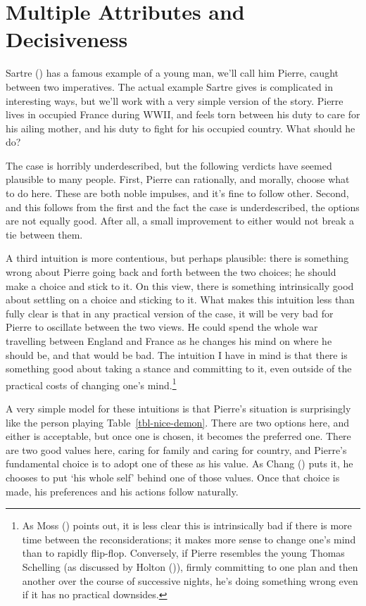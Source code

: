 \documentclass[
  11pt,
  letterpaper,
  DIV=11,
  numbers=noendperiod,
  twoside]{scrartcl}
\begin{document}
\section{Multiple Attributes and Decisiveness}\label{sec-sartre}

Sartre () has a famous example of a
young man, we'll call him Pierre, caught between two imperatives. The
actual example Sartre gives is complicated in interesting ways, but
we'll work with a very simple version of the story. Pierre lives in
occupied France during WWII, and feels torn between his duty to care for
his ailing mother, and his duty to fight for his occupied country. What
should he do?

The case is horribly underdescribed, but the following verdicts have
seemed plausible to many people. First, Pierre can rationally, and
morally, choose what to do here. These are both noble impulses, and it's
fine to follow other. Second, and this follows from the first and the
fact the case is underdescribed, the options are not equally good. After
all, a small improvement to either would not break a tie between them.

A third intuition is more contentious, but perhaps plausible: there is
something wrong about Pierre going back and forth between the two
choices; he should make a choice and stick to it. On this view, there is
something intrinsically good about settling on a choice and sticking to
it. What makes this intuition less than fully clear is that in any
practical version of the case, it will be very bad for Pierre to
oscillate between the two views. He could spend the whole war travelling
between England and France as he changes his mind on where he should be,
and that would be bad. The intuition I have in mind is that there is
something good about taking a stance and committing to it, even outside
of the practical costs of changing one's mind.\footnote{As Moss
  () points out, it is less clear this is
  intrinsically bad if there is more time between the reconsiderations;
  it makes more sense to change one's mind than to rapidly flip-flop.
  Conversely, if Pierre resembles the young Thomas Schelling (as
  discussed by Holton ()), firmly
  committing to one plan and then another over the course of successive
  nights, he's doing something wrong even if it has no practical
  downsides.}

A very simple model for these intuitions is that Pierre's situation is
surprisingly like the person playing Table~\ref{tbl-nice-demon}. There
are two options here, and either is acceptable, but once one is chosen,
it becomes the preferred one. There are two good values here, caring for
family and caring for country, and Pierre's fundamental choice is to
adopt one of these as his value. As Chang
() puts it, he chooses to put `his whole
self' behind one of those values. Once that choice is made, his
preferences and his actions follow naturally.
\end{document}
